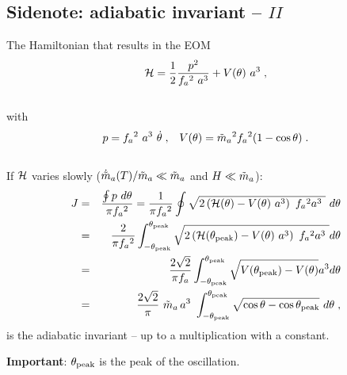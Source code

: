 \documentclass[10pt,utf8,compress,xcolor=dvipsnames]{beamer}
\begin{document}
\subsection{Sidenote: adiabatic invariant -- $II$}
\begin{frame}{\insertsubsectionhead}
	The Hamiltonian that results in the EOM
	\begin{equation*}
	\mathcal{H} = \dfrac{1}{2} \dfrac{p^2}{f_{a}{}^2 \ a^3} + V(\theta) \ a^3\;,
	\end{equation*}\\[-0.3cm]
	with \\[-0.3cm]
	\begin{eqnarray*}
		& p = \fa^2 \ a^3 \ \dot \theta\;, \hfill
		& V(\theta) = \maT^2 \fa^2 (1-\cos \theta) \;.
	\end{eqnarray*}\\[-0.1cm]
	
	If $\mathcal{H}$ varies slowly ($\dot {\tilde{m}}_{a}(T)/\tilde m_{a}{} \ll \tilde m_{a}{}$ and $H \ll \tilde m_{a}{}$):
	\begin{eqnarray*}
		J &=& \dfrac{\oint p \ d \theta}{\pi f_{a}{}^2} = \dfrac{1}{\pi f_{a}{}^2} \oint \sqrt{ 2\left(  \mathcal{H}(\theta) - V(\theta) \ a^3 \right) \ f_{a}{}^2 a^3 \ }  \ d \theta  \\ &=&
		\dfrac{2}{\pi f_{a}{}^2} \int_{-\theta_{\rm peak}{}}^{\theta_{\rm peak}{}} \sqrt{ 2\left(  \mathcal{H}(\theta_{\rm peak}{}) - V(\theta) \ a^3 \right) \ f_{a}{}^2 a^3 \ } d \theta \\ &=&
		\dfrac{2 \sqrt{2} }{\pi f_{a}{}}  \int_{- \theta_{\rm peak}{}} ^{\theta_{\rm peak}{}}  \sqrt{ V(\theta_{\rm peak}{}) - V(\theta) } a^{3} d \theta \\ &=& 
		\dfrac{2 \sqrt{2} }{\pi} \ \tilde m_{a}{} \, a^3 \ \displaystyle \int_{- \theta_{\rm peak}{}}^{\theta_{\rm peak}{}} \sqrt{\cos \theta - \cos \theta_{\rm peak}{}} \ d \theta  \;,
	\end{eqnarray*}
	is the adiabatic invariant -- up to a multiplication with a constant.\pause\\[0.2cm]
	
	\begin{center}
		\textbf{Important}: $\theta_{\rm peak}{}$ is the peak of the oscillation.
	\end{center}
\end{frame}
%
\end{document}
